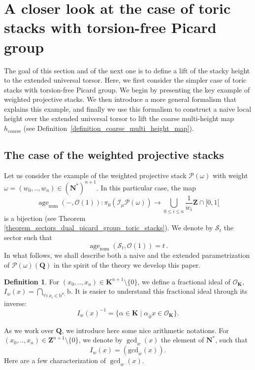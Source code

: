 \documentclass{proc-l}
\newcommand{\Z}{\mathbf{Z}}
\newcommand{\K}{\mathbf{K}}
\newcommand{\N}{\mathbf{N}}
\newcommand{\Q}{\mathbf{Q}}
\newcommand{\I}{\mathcal{I}}
\DeclareMathOperator{\num}{num}
\DeclareMathOperator{\age}{age}
\DeclareMathOperator{\coarse}{coarse}
\newcommand{\stackS}{\mathcal{S}}
\newcommand{\stackP}{\mathcal{P}}
\newcommand{\sheafO}{\mathcal{O}}
\newcommand{\w}{\omega}
\theoremstyle{definition}
\newtheorem{definition}[theorem]{Definition}
\theoremstyle{remark}
\numberwithin{equation}{section}
\begin{document}
\section{A closer look at the case of toric stacks with torsion-free Picard group}\label{appendix_B}





The goal of this section and of the next one is to define a lift of the stacky height to the extended universal torsor. Here, we first consider the simpler case of toric stacks with torsion-free Picard group. We begin by presenting the key example of weighted projective stacks. We then introduce a more general formalism that explains this example, and finally we use this formalism to construct a naive local height over the extended universal torsor to lift the coarse multi-height map $h_{\coarse}$ (see Definition~\ref{definition_coarse_multi_height_map}).

\subsection{The case of the weighted projective stacks}




Let us consider the example of the weighted projective stack $\stackP(\w)$ with weight $\w = (w_0,..,w_n) \in (\N^*)^{n + 1}$. In this particular case, the map $$\age_{\num}(-,\sheafO(1)) : \pi_0(\I_{\mu} \stackP(\w)) \rightarrow \bigcup\limits_{0 \leqslant i \leqslant n} \frac{1}{w_i} \Z \cap [0,1[$$ is a bijection (see Theorem \ref{theorem_sectors_dual_picard_group_toric_stacks}). We denote by $\stackS_t$ the sector such that $$\age_{\num}(\stackS_t,\sheafO(1)) = t \, .$$In what follows, we shall describe both a naive and the extended parametrization of $\stackP(\w)(\Q)$ in the spirit of the theory we develop this paper.

\begin{definition}
    For $(x_0,..,x_n) \in \K^{n+1} \setminus \{0\}$, we define a fractional ideal of $\sheafO_{\K}$, $I_w(x) = \bigcap\limits_{\forall i \ x_i \in \mathrm{b}^{w_i} } \mathrm{b}$. It is easier to understand this fractional ideal through its inverse:
    $$ I_w(x)^{-1} = \{ \alpha \in \K \mid \alpha \underset{w}{.} x \in \sheafO_{\K} \} .$$
\end{definition}

As we work over $\Q$, we introduce here some nice arithmetic notations. For $(x_0,..,x_n) \in \Z^{n+1} \setminus \{0\}$, we denote by $\gcd_w(x)$ the element of $\N^*$, such that $$I_w(x) = \left( \text{gcd}_w (x) \right).$$ Here are a few characterization of $\gcd_w(x)$.
\end{document}
